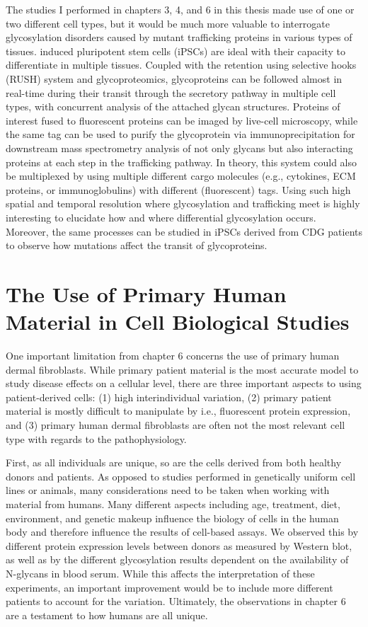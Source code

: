 The studies I performed in chapters 3, 4, and 6 in this thesis made use of one or two different cell types, but it would be much more valuable to interrogate glycosylation disorders caused by mutant trafficking proteins in various types of tissues. induced pluripotent stem cells (iPSCs) are ideal with their capacity to differentiate in multiple tissues. Coupled with the retention using selective hooks (RUSH) system\cite{boncompain_synchronization_2012} and glycoproteomics, glycoproteins can be followed almost in real-time during their transit through the secretory pathway in multiple cell types, with concurrent analysis of the attached glycan structures. Proteins of interest fused to fluorescent proteins can be imaged by live-cell microscopy, while the same tag can be used to purify the glycoprotein via immunoprecipitation for downstream mass spectrometry analysis of not only glycans but also interacting proteins at each step in the trafficking pathway. In theory, this system could also be multiplexed by using multiple different cargo molecules (e.g., cytokines, ECM proteins, or immunoglobulins) with different (fluorescent) tags. Using such high spatial and temporal resolution where glycosylation and trafficking meet is highly interesting to elucidate how and where differential glycosylation occurs. Moreover, the same processes can be studied in iPSCs derived from CDG patients to observe how mutations affect the transit of glycoproteins.

\section{The Use of Primary Human Material in Cell Biological Studies}

One important limitation from chapter 6 concerns the use of primary human dermal fibroblasts. While primary patient material is the most accurate model to study disease effects on a cellular level, there are three important aspects to using patient-derived cells: (1) high interindividual variation, (2) primary patient material is mostly difficult to manipulate by i.e., fluorescent protein expression, and (3) primary human dermal fibroblasts are often not the most relevant cell type with regards to the pathophysiology. 

First, as all individuals are unique, so are the cells derived from both healthy donors and patients. As opposed to studies performed in genetically uniform cell lines or animals, many considerations need to be taken when working with material from humans. Many different aspects including age, treatment, diet, environment, and genetic makeup influence the biology of cells in the human body and therefore influence the results of cell-based assays. We observed this by different protein expression levels between donors as measured by Western blot, as well as by the different glycosylation results dependent on the availability of N-glycans in blood serum. While this affects the interpretation of these experiments, an important improvement would be to include more different patients to account for the variation. Ultimately, the observations in chapter 6 are a testament to how humans are all unique.


